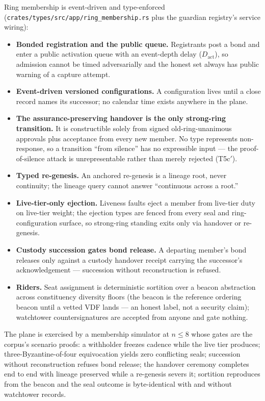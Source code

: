 \documentclass[11pt]{article}
\newcommand{\code}[1]{\texttt{#1}}
\begin{document}
Ring membership is event-driven and type-enforced
(\code{crates/types/src/app/ring\_membership.rs} plus the guardian
registry's service wiring):

\begin{itemize}[leftmargin=1.5em]
\item \textbf{Bonded registration and the public queue.} Registrants post
a bond and enter a public activation queue with an event-depth delay
(\(D_{\mathrm{act}}\)), so admission cannot be timed adversarially and
the honest set always has public warning of a capture attempt.
\item \textbf{Event-driven versioned configurations.} A configuration
lives until a close record names its successor; no calendar time exists
anywhere in the plane.
\item \textbf{The assurance-preserving handover is the only strong-ring
transition.} It is constructible solely from signed old-ring-unanimous
approvals plus acceptance from every new member. No type represents
non-response, so a transition ``from silence'' has no expressible input
--- the proof-of-silence attack is unrepresentable rather than merely
rejected (T5c\('\)).
\item \textbf{Typed re-genesis.} An anchored re-genesis is a lineage
root, never continuity; the lineage query cannot answer ``continuous
across a root.''
\item \textbf{Live-tier-only ejection.} Liveness faults eject a member
from live-tier duty on live-tier weight; the ejection types are fenced
from every seal and ring-configuration surface, so strong-ring standing
exits only via handover or re-genesis.
\item \textbf{Custody succession gates bond release.} A departing
member's bond releases only against a custody handover receipt carrying
the successor's acknowledgement --- succession without reconstruction is
refused.
\item \textbf{Riders.} Seat assignment is deterministic sortition over a
beacon abstraction across constituency diversity floors (the beacon is
the reference ordering beacon until a vetted VDF lands --- an honest
label, not a security claim); watchtower countersignatures are accepted
from anyone and gate nothing.
\end{itemize}

The plane is exercised by a membership simulator at \(n \le 8\) whose
gates are the corpus's scenario proofs: a withholder freezes cadence
while the live tier produces; three-Byzantine-of-four equivocation yields
zero conflicting seals; succession without reconstruction refuses bond
release; the handover ceremony completes end to end with lineage
preserved while a re-genesis severs it; sortition reproduces from the
beacon and the seal outcome is byte-identical with and without
watchtower records.
\end{document}
